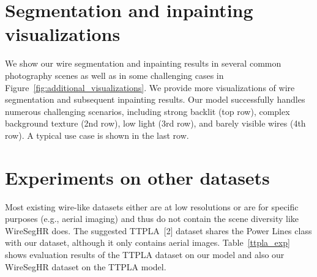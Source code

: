 \documentclass[10pt,twocolumn,letterpaper]{article}
\begin{document}





\section{Segmentation and inpainting visualizations}
\vspace{-1mm}
We show our wire segmentation and inpainting results in several common photography scenes as well as in some challenging cases in Figure~\ref{fig:additional_visualizations}. We provide more visualizations of wire segmentation and subsequent inpainting results. Our model successfully handles numerous challenging scenarios, including strong backlit (top row), complex background texture (2nd row), low light (3rd row), and barely visible wires (4th row). A typical use case is shown in the last row. 

\section{Experiments on other datasets}
\vspace{-1mm}
Most existing wire-like datasets either are at low resolutions or are for specific purposes (e.g., aerial imaging) and thus do not contain the scene diversity like WireSegHR does. The suggested TTPLA~[2] dataset shares the Power Lines class with our dataset, although it only contains aerial images. Table~\ref{ttpla_exp} shows evaluation results of the TTPLA dataset on our model and also our WireSegHR dataset on the TTPLA model.


\begin{table}[h!]
\caption{Comparison with TTPLA.}
\vspace{-5mm}
\label{ttpla_exp}
\end{table}
\end{document}
